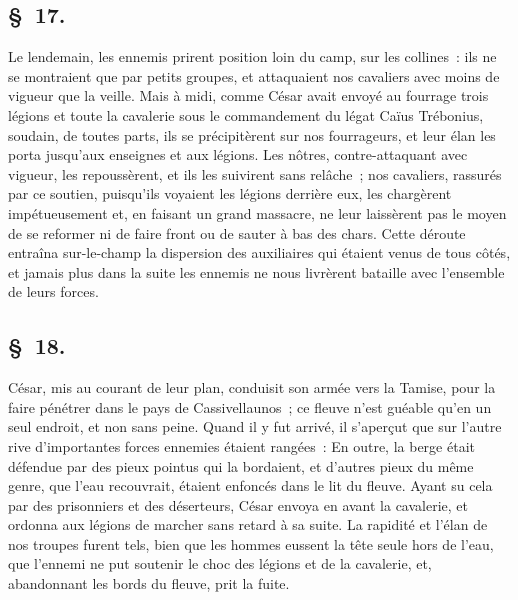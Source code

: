 \documentclass[french,twoside]{book} %
\begin{document}
\subsection[{§ 17.}]{ \textsc{§ 17.} }
\noindent Le lendemain, les ennemis prirent position loin du camp, sur les collines : ils ne se montraient que par petits groupes, et attaquaient nos cavaliers avec moins de vigueur que la veille. Mais à midi, comme César avait envoyé au fourrage trois légions et toute la cavalerie sous le commandement du légat Caïus Trébonius, soudain, de toutes parts, ils se précipitèrent sur nos fourrageurs, et leur élan les porta jusqu’aux enseignes et aux légions. Les nôtres, contre-attaquant avec vigueur, les repoussèrent, et ils les suivirent sans relâche ; nos cavaliers, rassurés par ce soutien, puisqu’ils voyaient les légions derrière eux, les chargèrent impétueusement et, en faisant un grand massacre, ne leur laissèrent pas le moyen de se reformer ni de faire front ou de sauter à bas des chars. Cette déroute entraîna sur-le-champ la dispersion des auxiliaires qui étaient venus de tous côtés, et jamais plus dans la suite les ennemis ne nous livrèrent bataille avec l’ensemble de leurs forces.
\subsection[{§ 18.}]{ \textsc{§ 18.} }
\noindent César, mis au courant de leur plan, conduisit son armée vers la Tamise, pour la faire pénétrer dans le pays de Cassivellaunos ; ce fleuve n’est guéable qu’en un seul endroit, et non sans peine. Quand il y fut arrivé, il s’aperçut que sur l’autre rive d’importantes forces ennemies étaient rangées : En outre, la berge était défendue par des pieux pointus qui la bordaient, et d’autres pieux du même genre, que l’eau recouvrait, étaient enfoncés dans le lit du fleuve. Ayant su cela par des prisonniers et des déserteurs, César envoya en avant la cavalerie, et ordonna aux légions de marcher sans retard à sa suite. La rapidité et l’élan de nos troupes furent tels, bien que les hommes eussent la tête seule hors de l’eau, que l’ennemi ne put soutenir le choc des légions et de la cavalerie, et, abandonnant les bords du fleuve, prit la fuite.
\end{document}
